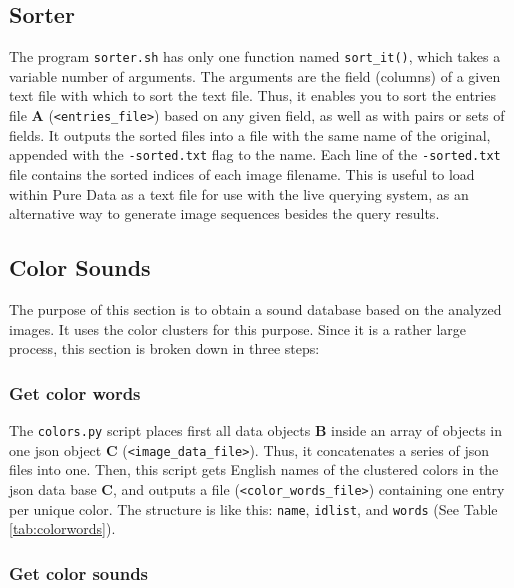 \subsection{Sorter}

The program \texttt{sorter.sh} has only one function named \texttt{sort\_it()}, which takes a variable number of arguments. The arguments are the field (columns) of a given text file with which to sort the text file. Thus, it enables you to sort the entries file \textbf{A} (\texttt{<entries\_file>}) based on any given field, as well as with pairs or sets of fields. It outputs the sorted files into a file with the same name of the original, appended with the \texttt{-sorted.txt} flag to the name. Each line of the \texttt{-sorted.txt} file contains the sorted indices of each image filename. This is useful to load within Pure Data as a text file for use with the live querying system, as an alternative way to generate image sequences besides the query results.



\subsection{Color Sounds}

The purpose of this section is to obtain a sound database based on the analyzed images. It uses the color clusters for this purpose. Since it is a rather large process, this section is broken down in three steps:


\subsubsection{Get color words}

The \texttt{colors.py} script places first all data objects \textbf{B} inside an array of objects in one \gls{json} object \textbf{C} (\texttt{<image\_data\_file>}). Thus, it concatenates a series of \gls{json} files into one. Then, this script gets English names of the clustered colors in the \gls{json} data base \textbf{C}, and outputs a file (\texttt{<color\_words\_file>}) containing one entry per unique color. The structure is like this: \texttt{name}, \texttt{idlist}, and \texttt{words} (See Table \ref{tab:colorwords}).



\subsubsection{Get color sounds}

